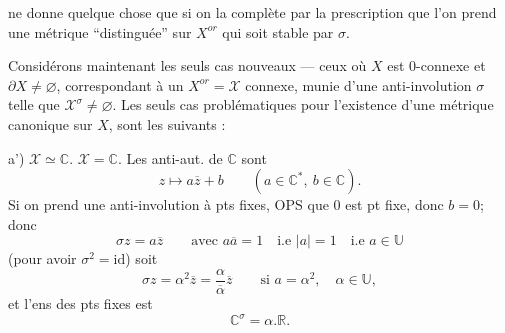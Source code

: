 ne donne quelque chose que si on la complète par la prescription que l'on prend une métrique ``distinguée'' sur $X^{or}$ qui soit stable par $\sigma$.

Considérons maintenant les seuls cas nouveaux --- ceux où $X$ est 0-connexe et $\partial X\ne\varnothing$, correspondant à un $X^{or}=\mathcal X$ connexe, munie d'une anti-involution $\sigma$ telle que $\mathcal X^\sigma\ne\varnothing$. Les seuls cas problématiques pour l'existence d'une métrique canonique sur $X$, sont les suivants :

a') $\mathcal X\simeq\mathbb C$.   $\mathcal X=\mathbb C$. Les anti-aut. de $\mathbb C$ sont
\[
z\longmapsto a\overline z+b\qquad(a\in\mathbb C^*,\ b\in\mathbb C).
\]
Si on prend une anti-involution à pts fixes, OPS que 0 est pt fixe, donc $b=0$; donc 
\[
\sigma z=a\overline z\qquad\text{avec }a\overline a=1\quad\text{i.e }|a|=1\quad\text{i.e }a\in\mathbb U
\]
(pour avoir $\sigma^2=\mathrm{id}$) soit
\[
\sigma z=\alpha^2\overline z=\frac\alpha{\overline\alpha}\overline z\qquad\text{si }a=\alpha^2,\quad\alpha\in\mathbb U,
\]
et l'ens des pts fixes est
\[
\mathbb C^\sigma=\alpha.\mathbb R.
\]
